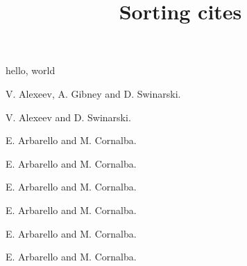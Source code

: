 \documentclass{amsart}
\title{Sorting cites}
\begin{document}
\maketitle

hello, world

\cite{A}

\cite[2.3]{A}

\cite{A,B}

\cite{B,A}

\cite{C,B,A}

\cite{D,C,B,A}

\cite{H,D,C,B,A}

\begin{thebibliography}{9}

 V. Alexeev, A. Gibney and D. Swinarski.  

 V. Alexeev and D. Swinarski. 

 E. Arbarello and M. Cornalba. 

 E. Arbarello and M. Cornalba. 

 E. Arbarello and M. Cornalba. 

 E. Arbarello and M. Cornalba. 

 E. Arbarello and M. Cornalba. 

 E. Arbarello and M. Cornalba. 

\end{thebibliography}
\end{document}
